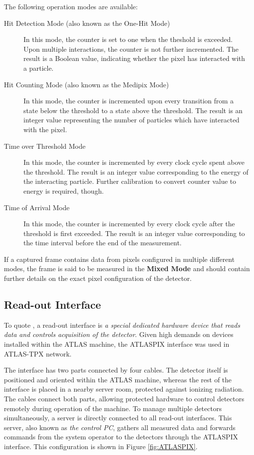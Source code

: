 The following operation modes are available:

\begin{description}
	\item[Hit Detection Mode (also known as the One-Hit Mode)]
	In this mode, the counter is set to one when the theshold is exceeded. Upon multiple interactions, the counter is not further incremented. The result is a Boolean value, indicating whether the pixel has interacted with a particle.

	\item[Hit Counting Mode (also known as the Medipix Mode)]
	In this mode, the counter is incremented upon every transition from a state below the threshold to a state above the threshold. The result is an integer value representing the number of particles which have interacted with the pixel.

	\item[Time over Threshold Mode]\label{tpx:tot}
	In this mode, the counter is incremented by every clock cycle spent above the threshold. The result is an integer value corresponding to the energy of the interacting particle. Further calibration to convert counter value to energy is required, though.

	\item[Time of Arrival Mode]\label{tpx:toa}
	In this mode, the counter is incremented by every clock cycle after the threshold is first exceeded. The result is an integer value corresponding to the time interval before the end of the measurement.
\end{description}

If a captured frame contains data from pixels configured in multiple different modes, the frame is said to be measured in the \textbf{Mixed Mode} and should contain further details on the exact pixel configuration of the detector.


\subsection{Read-out Interface}
To quote \cite{TurecekThesis2011}, a read-out interface is \textit{a special dedicated hardware device that reads data and controls acquisition of the detector}. Given high demands on devices installed within the ATLAS machine, the ATLASPIX interface was used in ATLAS-TPX network.


The interface has two parts connected by four cables. The detector itself is positioned and oriented within the ATLAS machine, whereas the rest of the interface is placed in a nearby server room, protected against ionizing radiation. The cables connect both parts, allowing protected hardware to control detectors remotely during operation of the machine. To manage multiple detectors simultaneously, a server is directly connected to all read-out interfaces. This server, also known as \textit{the control PC}, gathers all measured data and forwards commands from the system operator to the detectors through the ATLASPIX interface. This configuration is shown in Figure \ref{fig:ATLASPIX}.

